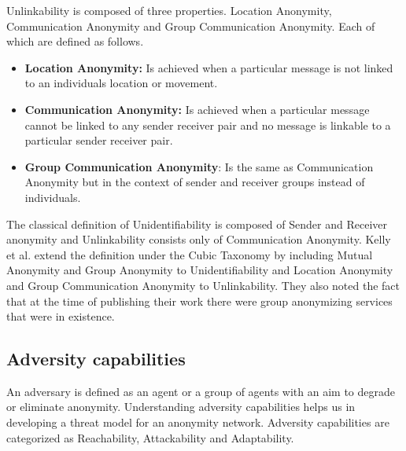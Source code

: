 \documentclass{llncs}
\begin{document}
Unlinkability is composed of three properties. Location Anonymity, Communication Anonymity and Group Communication Anonymity. Each of which are defined as follows.
\begin{itemize}
	\item[]{\textbf{Location Anonymity:} Is achieved when a particular message is not linked to an individuals location or movement.}
	\item[]{\textbf{Communication Anonymity:} Is achieved when a particular message cannot be linked to any sender receiver pair and no message is linkable to a particular sender receiver pair.}
	\item[]{\textbf{Group Communication Anonymity}: Is the same as Communication Anonymity but in the context of sender and receiver groups instead of individuals.}
\end{itemize}

The classical definition of Unidentifiability is composed of Sender and Receiver anonymity and Unlinkability consists only of Communication Anonymity. Kelly et al. \cite{kelly2012exploring} extend the definition under the Cubic Taxonomy by including Mutual Anonymity and Group Anonymity to Unidentifiability and Location Anonymity and Group Communication Anonymity to Unlinkability. They also noted the fact that at the time of publishing their work there were group anonymizing services that were in existence.

\subsection{Adversity capabilities}
An adversary is defined as an agent or a group of agents with an aim to degrade or eliminate anonymity. Understanding adversity capabilities helps us in developing a threat model for an anonymity network. Adversity capabilities are categorized as Reachability, Attackability and Adaptability.
\end{document}
